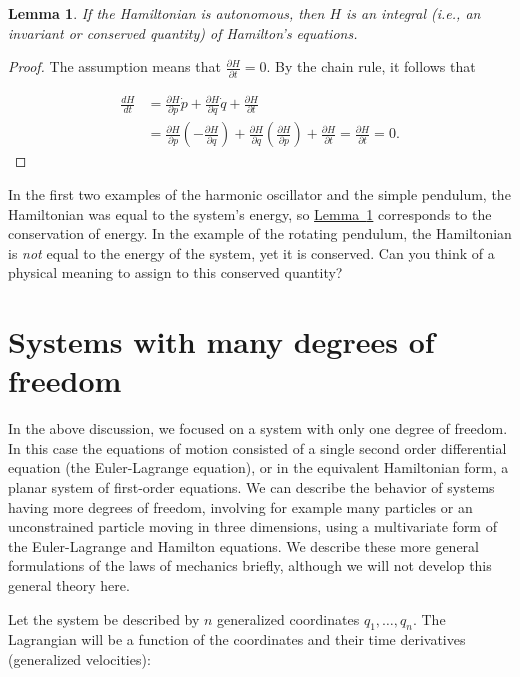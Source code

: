 \documentclass[11pt]{report}
\theoremstyle{plain}
\newtheorem{lem}[thm]{Lemma}
\theoremstyle{definition}
\begin{document}
\begin{lem}
\label{lem:hamiltonian-conserved}
If the Hamiltonian is autonomous, then $H$ is an
integral (i.e., an invariant or conserved quantity) of
Hamilton's equations.
\end{lem}

\begin{proof}
The assumption means that
$\frac{\partial H}{\partial t} = 0$. By the chain
rule, it follows that

\begin{align*}
\frac{dH}{dt} &= \frac{\partial H}{\partial p} \dot{p}+\frac{\partial H}{\partial q} \dot{q} + \frac{\partial H}{\partial t} \\
&= \frac{\partial H}{\partial p}\left(-\frac{\partial H}{\partial q}\right)+\frac{\partial H}{\partial q}\left(\frac{\partial H}{\partial p}\right)+\frac{\partial H}{\partial t}
= \frac{\partial H}{\partial t} = 0.
\end{align*}

\end{proof}

\noindent In the first two examples of the harmonic oscillator
and the simple pendulum, the Hamiltonian was equal to
the system's energy, so \texorpdfstring{\hyperref[lem:hamiltonian-conserved]{Lemma~\ref*{lem:hamiltonian-conserved}}}{Lemma} corresponds to the
conservation of energy. In the example of the rotating
pendulum, the Hamiltonian is \emph{not} equal to the energy
of the system, yet it is conserved. Can you think of a
physical meaning to assign to this conserved quantity?

\section{Systems with many degrees of freedom}

In the above discussion, we focused on a system with
only one degree of freedom. In this case the equations
of motion consisted of a single second order
differential equation (the Euler-Lagrange equation),
or in the equivalent Hamiltonian form, a planar system
of first-order equations. We can describe the behavior
of systems having more degrees of freedom, involving
for example many particles or an unconstrained
particle moving in three dimensions, using a
multivariate form of the Euler-Lagrange and Hamilton
equations. We describe these more general formulations
of the laws of mechanics briefly, although we will not
develop this general theory here.

Let the system be described by $n$ generalized
coordinates $q_1, \ldots, q_n$. The Lagrangian will be
a function of the coordinates and their time
derivatives (generalized velocities):
\end{document}
